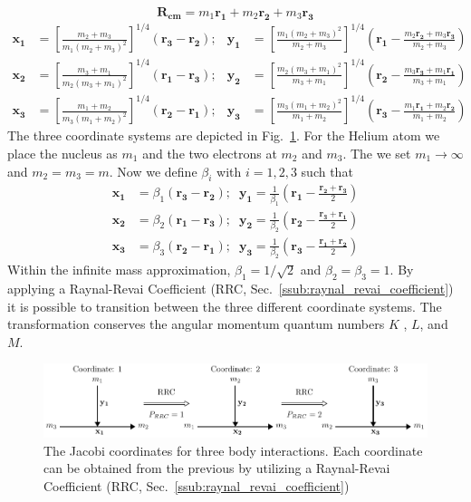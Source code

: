 \begin{equation}
\mathbf{R_{cm}} = m_1 \mathbf{r_1} + m_2 \mathbf{r_2} + m_3 \mathbf{r_3}
\end{equation}
\begin{align}
\label{eq:jacobi_coords}
\mathbf{x_1} &= \left[\frac{m_2+m_3}{m_1(m_2+m_3)^2}\right]^{1/4} (\mathbf{r_3}-\mathbf{r_2}); &\mathbf{y_1} &= \left[\frac{m_1(m_2+m_3)^2}{m_2+m_3}\right]^{1/4} \left(\mathbf{r_1}- \frac{m_2\mathbf{r_2}+m_3\mathbf{r_3}}{m_2+m_3} \right)\\
\mathbf{x_2} &= \left[\frac{m_3+m_1}{m_2(m_3+m_1)^2}\right]^{1/4} (\mathbf{r_1}-\mathbf{r_3}); &\mathbf{y_2} &= \left[\frac{m_2(m_3+m_1)^2}{m_3+m_1}\right]^{1/4} \left(\mathbf{r_2}- \frac{m_3\mathbf{r_3}+m_1\mathbf{r_1}}{m_3+m_1} \right)\\
\mathbf{x_3} &= \left[\frac{m_1+m_2}{m_3(m_1+m_2)^2}\right]^{1/4} (\mathbf{r_2}-\mathbf{r_1}); &\mathbf{y_3} &= \left[\frac{m_3(m_1+m_2)^2}{m_1+m_2}\right]^{1/4} \left(\mathbf{r_3}- \frac{m_1\mathbf{r_1}+m_2\mathbf{r_2}}{m_1+m_2} \right)
\end{align}
The three coordinate systems are depicted in Fig.~\ref{fig:jacobi_coord}. For the Helium atom we place the nucleus as $m_1$ and the two electrons at $m_2$ and $m_3$. The we set $m_1\rightarrow \infty$ and $m_2=m_3=m$. Now we define $\beta_i$ with $i=1,2,3$ such that
\begin{align}
\mathbf{x_1} &= \beta_1 (\mathbf{r_3}-\mathbf{r_2}); \; \; \mathbf{y_1} = \frac{1}{\beta_1} \left(\mathbf{r_1}- \frac{\mathbf{r_2}+\mathbf{r_3}}{2} \right)\\
\mathbf{x_2} &= \beta_2 (\mathbf{r_1}-\mathbf{r_3}); \; \; \mathbf{y_2} = \frac{1}{\beta_2} \left(\mathbf{r_2}- \frac{\mathbf{r_3}+\mathbf{r_1}}{2} \right)\\
\mathbf{x_3} &= \beta_3 (\mathbf{r_2}-\mathbf{r_1}); \; \; \mathbf{y_3} = \frac{1}{\beta_2} \left(\mathbf{r_3}- \frac{\mathbf{r_1}+\mathbf{r_2}}{2} \right)
\end{align}
Within the infinite mass approximation, $\beta_1=1/\sqrt{2}$ and $\beta_2=\beta_3=1$. By applying a Raynal-Revai Coefficient (RRC, Sec.~\ref{ssub:raynal_revai_coefficient}) it is possible to transition between the three different coordinate systems.  The transformation conserves the angular momentum quantum numbers $K$ , $L$, and $M$.

\begin{figure}[t]
\centering
\includegraphics[width=\linewidth]{figs/Two_electron/coord_1.pdf}
\caption{The Jacobi coordinates for three body interactions. Each coordinate can be obtained from the previous by utilizing a Raynal-Revai Coefficient (RRC, Sec.~\ref{ssub:raynal_revai_coefficient})} 
  \label{fig:jacobi_coord}
\end{figure}

